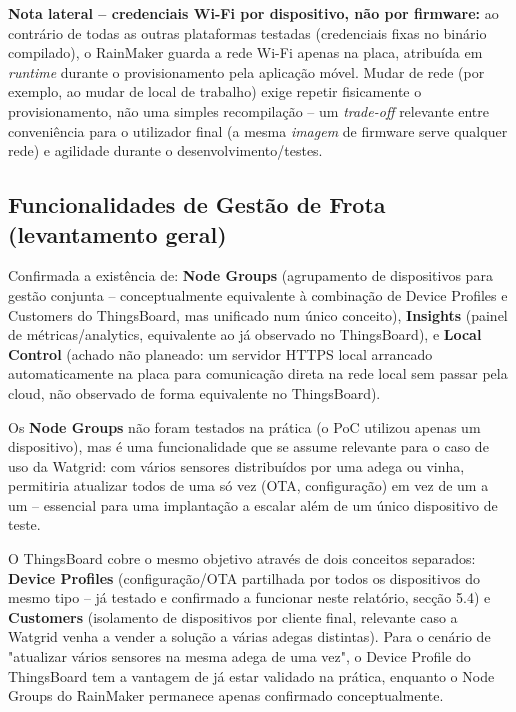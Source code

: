 \documentclass[a4paper,12pt]{article}
\begin{document}
\textbf{Nota lateral -- credenciais Wi-Fi por dispositivo, não por firmware:} ao contrário de todas as outras plataformas testadas (credenciais fixas no binário compilado), o RainMaker guarda a rede Wi-Fi apenas na placa, atribuída em \textit{runtime} durante o provisionamento pela aplicação móvel. Mudar de rede (por exemplo, ao mudar de local de trabalho) exige repetir fisicamente o provisionamento, não uma simples recompilação -- um \textit{trade-off} relevante entre conveniência para o utilizador final (a mesma \textit{imagem} de firmware serve qualquer rede) e agilidade durante o desenvolvimento/testes.

\subsection{Funcionalidades de Gestão de Frota (levantamento geral)}
Confirmada a existência de: \textbf{Node Groups} (agrupamento de dispositivos para gestão conjunta -- conceptualmente equivalente à combinação de Device Profiles e Customers do ThingsBoard, mas unificado num único conceito), \textbf{Insights} (painel de métricas/analytics, equivalente ao já observado no ThingsBoard), e \textbf{Local Control} (achado não planeado: um servidor HTTPS local arrancado automaticamente na placa para comunicação direta na rede local sem passar pela cloud, não observado de forma equivalente no ThingsBoard).

Os \textbf{Node Groups} não foram testados na prática (o PoC utilizou apenas um dispositivo), mas é uma funcionalidade que se assume relevante para o caso de uso da Watgrid: com vários sensores distribuídos por uma adega ou vinha, permitiria atualizar todos de uma só vez (OTA, configuração) em vez de um a um -- essencial para uma implantação a escalar além de um único dispositivo de teste.

O ThingsBoard cobre o mesmo objetivo através de dois conceitos separados: \textbf{Device Profiles} (configuração/OTA partilhada por todos os dispositivos do mesmo tipo -- já testado e confirmado a funcionar neste relatório, secção 5.4) e \textbf{Customers} (isolamento de dispositivos por cliente final, relevante caso a Watgrid venha a vender a solução a várias adegas distintas). Para o cenário de "atualizar vários sensores na mesma adega de uma vez", o Device Profile do ThingsBoard tem a vantagem de já estar validado na prática, enquanto o Node Groups do RainMaker permanece apenas confirmado conceptualmente.
\end{document}
